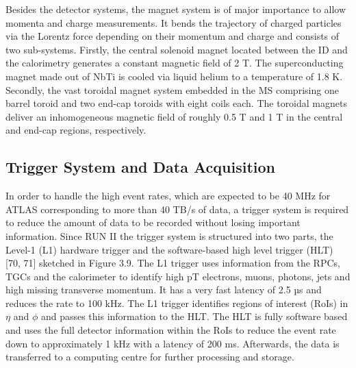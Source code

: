 Besides the detector systems, the magnet system is of major importance to allow momenta and charge measurements. It bends the trajectory of charged particles via the Lorentz force depending on their momentum and charge and consists of two sub-systems. Firstly, the central solenoid magnet located between the ID and the calorimetry generates a constant magnetic field of 2 T. The superconducting magnet made out of NbTi is cooled via liquid helium to a temperature of 1.8 K. Secondly, the vast toroidal magnet system embedded in the MS comprising one barrel toroid and two end-cap toroids with eight coils each. The toroidal magnets deliver an inhomogeneous magnetic field of roughly 0.5 T and 1 T in the central and end-cap regions, respectively.

\subsection{Trigger System and Data Acquisition}

In order to handle the high event rates, which are expected to be 40 MHz for ATLAS corresponding to more than 40 TB/s of data, a trigger system is required to reduce the amount of data to be recorded without losing important information. Since RUN II the trigger system is structured into two parts, the Level-1 (L1) hardware trigger and the software-based high level trigger (HLT) [70, 71] sketched in Figure 3.9. The L1 trigger uses information from the RPCs, TGCs and the calorimeter to identify high pT electrons, muons, photons, jets and high missing transverse momentum. It has a very fast latency of 2.5 µs and reduces the rate to 100 kHz. The L1 trigger identifies regions of interest (RoIs) in $\eta$ and $\phi$ and passes this information to the HLT. The HLT is fully software based and uses the full detector information within the RoIs to reduce the event rate down to approximately 1 kHz with a latency of 200 ms. Afterwards, the data is transferred to a computing centre for further processing and storage.

